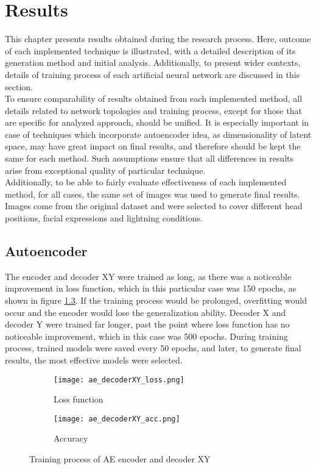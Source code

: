 \chapter{Results}
This chapter presents results obtained during the research process. Here, outcome of each implemented technique is illustrated, with a detailed description of its generation method and initial analysis. Additionally, to present wider contexts, details of training process of each artificial neural network are discussed in this section.\\

To ensure comparability of results obtained from each implemented method, all details related to network topologies and training process, except for those that are specific for analyzed approach, should be unified. It is especially important in case of techniques which incorporate autoencoder idea, as dimensionality of latent space, may have great impact on final results, and therefore should be kept the same for each method. Such assumptions ensure that all differences in results arise from exceptional quality of particular technique.\\

Additionally, to be able to fairly evaluate effectiveness of each implemented method, for all cases, the same set of images was used to generate final results. Images come from the original dataset and were selected to cover different head positions, facial expressions and lightning conditions.

\newpage
\section{Autoencoder}
\label{Results_Autoencoder}
The encoder and decoder XY were trained as long, as there was a noticeable improvement in loss function, which in this particular case was 150 epochs, as shown in figure \ref{fig:ae_decoderXY}. If the training process would be prolonged, overfitting would occur and the encoder would lose the generalization ability. Decoder X and decoder Y were trained far longer, past the point where loss function has no noticeable improvement, which in this case was 500 epochs. During training process, trained models were saved every 50 epochs, and later, to generate final results, the most effective models were selected.

\begin{figure}[H]
\centering
\begin{subfigure}{.5\textwidth}
  \centering
  \texttt{[image: ae\_decoderXY\_loss.png]}
  \caption{Loss function}
  \label{subfig:ae_decoderXY_loss}
\end{subfigure}%
\begin{subfigure}{.5\textwidth}
  \centering
  \texttt{[image: ae\_decoderXY\_acc.png]}
  \caption{Accuracy}
  \label{subfig:ae_decoderXY_acc}
\end{subfigure}
\caption{Training process of AE encoder and decoder XY}
\label{fig:ae_decoderXY}
\end{figure}

